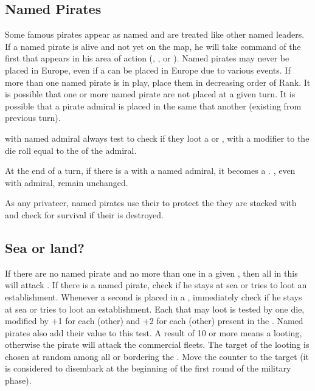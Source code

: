 \subsection{Named Pirates}\label{chEvents:Named Pirates}

\aparag Some famous pirates appear as named  \LeaderP and
are treated like other named leaders.
\bparag If a named pirate is alive and not yet on the map, he will take
command of the first \PIRATE that appears in his area of action
(, , or \ROTW).
\bparag Named pirates may never be placed in Europe, even if a \PIRATE
can be placed in Europe due to various events.
\bparag If more than one named pirate is in play, place them in
decreasing order of Rank. It is possible that one or more named pirate
are not placed at a given turn. It is possible that a pirate admiral is
placed in the same \STZ that another (existing from previous turn).

\aparag \PIRATE with named admiral always test to check if they loot a
\TP or \COL, with a modifier to the die roll equal to the 
of the admiral.

\aparag At the end of a turn, if there is a \PIRATE\facemoins with a
named admiral, it becomes a \PIRATE\faceplus. \PIRATE\faceplus, even
with admiral, remain unchanged.

\aparag As any privateer, named pirates use their  to
protect the \PIRATE they are stacked with and check for survival if
their \PIRATE is destroyed.



\subsection{Sea or land?}\label{chEvents:PiracyTarget}

\aparag If there are no named pirate and no more than one
\PIRATE\faceplus in a given \STZ, then all \PIRATE in this \STZ will
attack \TradeFLEET.
\bparag If there is a named pirate, check if he stays at sea or tries to
loot an establishment.
\bparag Whenever a second \PIRATE\faceplus is placed in a \STZ,
immediately check if he stays at sea or tries to loot an establishment.
\aparag Each \PIRATE that may loot is tested by one die, modified by +1
for each (other) \PIRATE\facemoins and +2 for each (other)
\PIRATE\faceplus present in the \STZ.
\bparag Named pirates also add their  value to this test.
\bparag A result of 10 or more means a looting, otherwise the pirate
will attack the commercial fleets.
\bparag The target of the looting is chosen at random among all \TP or
\COL bordering the \STZ. Move the counter to the target (it is
considered to disembark at the beginning of the first round of the
military phase).




